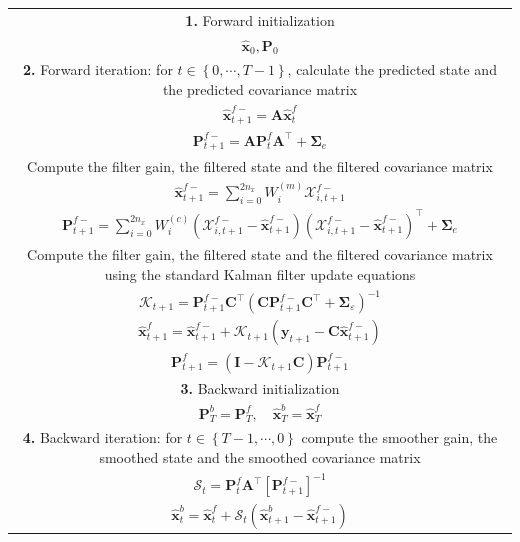 \documentclass[review,authoryear,3p]{elsarticle}
\begin{document}
\begin{table}[!ht]
\begin{tabular}{|c|}\hline
\multicolumn{1}{|p{16cm}|}{\textbf{1.} Forward initialization} \\ 
$\hat{\mathbf x}_0, \mathbf P_0$ \\
\hline
\multicolumn{1}{|p{16cm}|}{\textbf{2.} Forward iteration: for $t\in\left\lbrace 0,\cdots,T-1\right\rbrace $, calculate the predicted state and the predicted covariance matrix } \\
$\hat{\mathbf x}_{t+1}^{f-}=\mathbf A \hat{\mathbf x}_{t}^{f}$  \\ 
$\mathbf P_{t+1}^{f-}=\mathbf A \mathbf P_{t}^{f}\mathbf A^{\top}+\boldsymbol\Sigma_e$  \\
\multicolumn{1}{|p{16cm}|}{Compute the filter gain, the filtered state and the filtered covariance matrix} \\
$\hat{\mathbf x}_{t+1}^{f-}=\sum_{i=0}^{2n_x} W_i^{(m)}\mathcal X_{i,t+1}^{f-} $ \\
$\mathbf P_{t +1}^{f-}=\sum_{i=0}^{2n_x} W_i^{(c)}(\mathcal X_{i,t+1}^{f-}-\hat{\mathbf x}_{t +1}^{f-})(\mathcal X_{i,t+1}^{f-}-\hat{\mathbf x}_{t +1}^{f-})^\top+\boldsymbol \Sigma_e$ \\ 
\multicolumn{1}{|p{16cm}|}{Compute the filter gain, the filtered state and the filtered covariance matrix using the standard Kalman filter update equations} \\
$\mathcal K_{t+1}=\mathbf P_{t +1}^{f-}\mathbf C ^\top(\mathbf C \mathbf P_{t +1}^{f-}\mathbf C ^\top+\boldsymbol \Sigma_{\varepsilon})^{-1}$\\
$\hat{\mathbf x}_{t+1}^{f}=\hat{\mathbf x}_{t+1}^{f-}+\mathcal K_{t+1}(\mathbf y_{t+1}-\mathbf C\hat{\mathbf x}_{t +1}^{f-})$\\
$\mathbf P_{t+1}^f=(\mathbf I - \mathcal K_{t+1}\mathbf C)\mathbf P_{t +1}^{f-}$\\
\hline
\multicolumn{1}{|p{16cm}|}{\textbf{3.} Backward initialization}\\
 $\mathbf P_T^b= \mathbf P_T^f, \quad \hat{\mathbf x}^b_T= \hat{\mathbf x}^f_T$\\
\hline
\multicolumn{1}{|p{16cm}|}{\textbf{4.} Backward iteration: for $t\in\left\lbrace T-1,\cdots,0\right\rbrace $ compute the smoother gain, the smoothed state and the smoothed covariance matrix}\\  
$\mathcal S_{t}=\mathbf P_{t}^{f}\mathbf A^{\top}\left[ \mathbf P_{t +1}^{f-}\right]^{-1}$ \\
 $\hat{\mathbf x}_t^b=\hat{\mathbf x}_t^f+\mathcal S_t(\hat{\mathbf x}_{t+1}^{b}-\hat{\mathbf x}_{t+1}^{f-})$ \\

\end{tabular}
\end{table}
\end{document}
